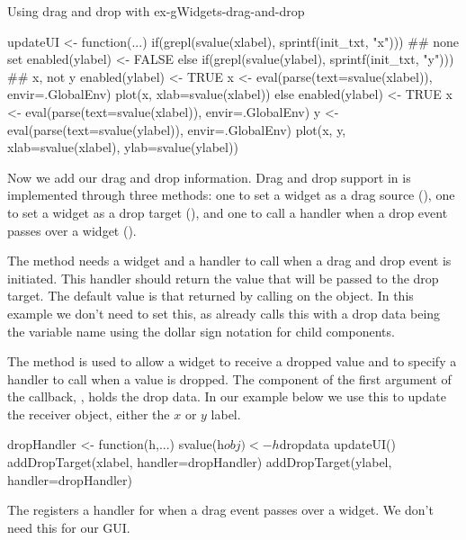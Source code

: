\begin{example}{Using drag and drop with }{ex-gWidgets-drag-and-drop}
\begin{Schunk}
\begin{Sinput}
 updateUI <- function(...) {
   if(grepl(svalue(xlabel), sprintf(init_txt, "x"))) {
     ## none set
     enabled(ylabel) <- FALSE
   } else if(grepl(svalue(ylabel), sprintf(init_txt, "y"))) {
     ## x, not y
     enabled(ylabel) <- TRUE
     x <- eval(parse(text=svalue(xlabel)), envir=.GlobalEnv)
     plot(x, xlab=svalue(xlabel))
   } else {
     enabled(ylabel) <- TRUE    
     x <- eval(parse(text=svalue(xlabel)), envir=.GlobalEnv)
     y <- eval(parse(text=svalue(ylabel)), envir=.GlobalEnv)
     plot(x, y, xlab=svalue(xlabel), ylab=svalue(ylabel))
   }
 }
\end{Sinput}
\end{Schunk}

Now we add our drag and drop information.  Drag and drop support in
 is implemented through three methods: one to set a
widget as a drag source (), one to set a widget
as a drop target (), and one to call a handler
when a drop event passes over a widget ().
  
The  method needs a widget and a handler to
call when a drag and drop event is initiated. This handler should
return the value that will be passed to the drop target. The default
value is that returned by calling  on the object. In this
example we don't need to set this, as  already
calls this with a drop data being the variable name using the dollar
sign notation for child components.
    
The  method is used to allow a widget to
receive a dropped value and to specify a handler to call when a value
is dropped. The  component of the first argument of the
callback, , holds the drop data. In our example below we use
this to update the receiver object, either the $x$ or $y$ label.

\begin{Schunk}
\begin{Sinput}
 dropHandler <- function(h,...) {
   svalue(h$obj) <- h$dropdata
   updateUI()
 }
 addDropTarget(xlabel, handler=dropHandler)
 addDropTarget(ylabel, handler=dropHandler)
\end{Sinput}
\end{Schunk}


The  registers a handler for when a drag event
passes over a widget. We don't need this for our GUI.
    
\end{example}



